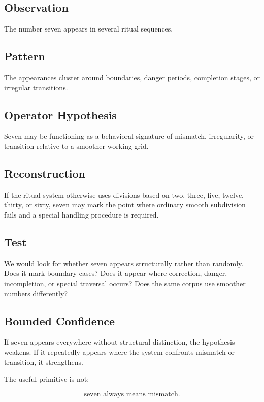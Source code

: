 \documentclass[11pt]{book}
\begin{document}
\subsection{Observation}

The number seven appears in several ritual sequences.

\subsection{Pattern}

The appearances cluster around boundaries, danger periods, completion stages, or irregular transitions.

\subsection{Operator Hypothesis}

Seven may be functioning as a behavioral signature of mismatch, irregularity, or transition relative to a smoother working grid.

\subsection{Reconstruction}

If the ritual system otherwise uses divisions based on two, three, five, twelve, thirty, or sixty, seven may mark the point where ordinary smooth subdivision fails and a special handling procedure is required.

\subsection{Test}

We would look for whether seven appears structurally rather than randomly. Does it mark boundary cases? Does it appear where correction, danger, incompletion, or special traversal occurs? Does the same corpus use smoother numbers differently?

\subsection{Bounded Confidence}

If seven appears everywhere without structural distinction, the hypothesis weakens. If it repeatedly appears where the system confronts mismatch or transition, it strengthens.

The useful primitive is not:

\[
\text{seven always means mismatch}.
\]
\end{document}
